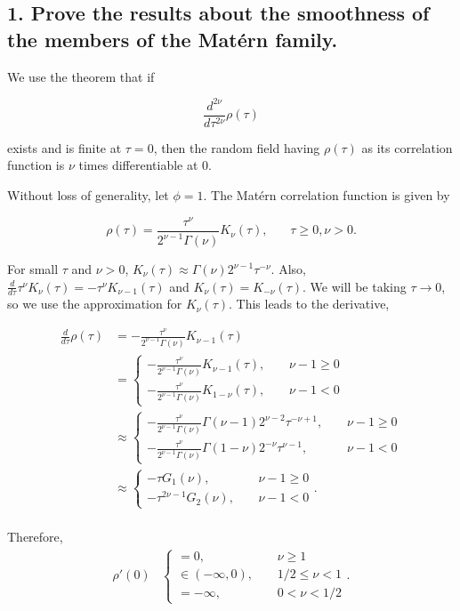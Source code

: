 \documentclass[12pt]{article}
\begin{document}
\subsection*{1. Prove the results about the smoothness of the members of the Mat{\'e}rn family.}

We use the theorem that if 

\[ \frac{d^{2\nu}}{d\tau^{2\nu}}\rho(\tau) \]

exists and is finite at $\tau=0$, then the random field having $\rho(\tau)$ as its correlation function is $\nu$ times differentiable at $0$.
\bigskip

Without loss of generality, let $\phi=1$. The Mat{\'e}rn correlation function is given by

\[ \rho(\tau) = \frac{\tau^\nu}{2^{\nu-1}\Gamma(\nu)}K_\nu(\tau),~~~~~~~~\tau\geq0,\nu>0. \]

For small $\tau$ and $\nu>0$, $K_\nu(\tau)\approx \Gamma(\nu)2^{\nu-1}\tau^{-\nu}$. Also, $\frac{d}{d\tau}\tau^\nu K_\nu(\tau)=-\tau^\nu K_{\nu-1}(\tau)$ and $K_\nu(\tau)=K_{-\nu}(\tau)$. We will be taking $\tau\rightarrow 0$, so we use the approximation for $K_\nu(\tau)$. This leads to the derivative,

\begin{align*}
\frac{d}{d\tau}\rho(\tau) &= -\frac{\tau^\nu}{2^{\nu-1}\Gamma(\nu)}K_{\nu-1}(\tau) \\
 &= \begin{cases} -\frac{\tau^\nu}{2^{\nu-1}\Gamma(\nu)}K_{\nu-1}(\tau),~~~~~&\nu-1\geq0 \\
 -\frac{\tau^\nu}{2^{\nu-1}\Gamma(\nu)}K_{1-\nu}(\tau),~~~~~&\nu-1<0 \end{cases} \\
 &\approx \begin{cases} -\frac{\tau^\nu}{2^{\nu-1}\Gamma(\nu)}\Gamma(\nu-1)2^{\nu-2}\tau^{-\nu+1},~~~~~&\nu-1\geq0 \\
 -\frac{\tau^\nu}{2^{\nu-1}\Gamma(\nu)}\Gamma(1-\nu)2^{-\nu}\tau^{\nu-1},~~~~~&\nu-1<0 \end{cases} \\
 &\approx \begin{cases} -\tau G_1(\nu),~~~~~&\nu-1\geq0 \\
 -\tau^{2\nu-1}G_2(\nu),~~~~~&\nu-1<0 \end{cases}. \\
\end{align*}

Therefore,
\begin{align*}
\rho'(0) &\begin{cases} =0,~~~~~&\nu\geq1 \\
 \in(-\infty,0),~~~~~&1/2\leq\nu<1  \\
 =-\infty,~~~~~&0<\nu<1/2 \end{cases}. \\
\end{align*}
\end{document}
